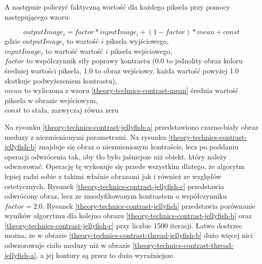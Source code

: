 \documentclass[a4paper, 12pt, polish, twoside]{extreport}
\begin{document}
        A następnie policzyć faktyczną wartość dla każdego piksela przy pomocy następującego wzoru:
        
        \begin{equation} \label{theory-technics-contrast-equation}
            outputImage_{i} = factor*inputImage_{i} + (1-factor)*mean + const
        \end{equation}
        gdzie \textbf{\(outputImage_{i}\)} to wartość \(i\) piksela wyjściowego, \\
        \(inputImage_{i}\) to wartość wartość \(i\) piksela wejściowego, \\
        \(factor\) to współczynnik siły poprawy kontrastu (0.0 to jednolity obraz koloru średniej wartości piksela, 1.0 to obraz wejściowy, każda wartość powyżej 1.0 skutkuje podwyższeniem kontrastu), \\
        \(mean\) to wyliczona z wzoru \eqref{theory-technics-contrast-mean} średnia wartość piksela w obrazie wejściowym, \\
        \(const\) to stała, zazwyczaj równa zeru
        
        Na rysunku \ref{theory-technics-contrast-jellyfish-a} przedstawiono czarno-biały obraz meduzy z niezmienionymi parametrami. Na rysunku \ref{theory-technics-contrast-jellyfish-b} znajduje się obraz o niezmienionym kontraście, lecz po poddaniu operacji odwrócenia tak, aby tło było jaśniejsze niż obiekt, który należy odwzorować. Operację tę wykonuje się przede wszystkim dlatego, że algorytm lepiej radzi sobie z takimi właśnie obrazami jak i również ze względów estetycznych. Rysunek \ref{theory-technics-contrast-jellyfish-c} przedstawia odwrócony obraz, lecz ze zmodyfikowanym kontrastem o współczynniku \(factor = 2.0\). Rysunek \ref{theory-technics-contrast-jellyfish} przedstawia porównanie wyników algorytmu dla kolejno obrazu \ref{theory-technics-contrast-jellyfish-b} oraz \ref{theory-technics-contrast-jellyfish-c} przy liczbie 1500 iteracji. Łatwo dostrzec można, że w obrazie \ref{theory-technics-contrast-thread-jellyfish-b} dużo więcej nici odwzorowuje ciało meduzy niż w obrazie \ref{theory-technics-contrast-thread-jellyfish-a}, a jej kontury są przez to dużo wyraźniejsze.
        
\end{document}
